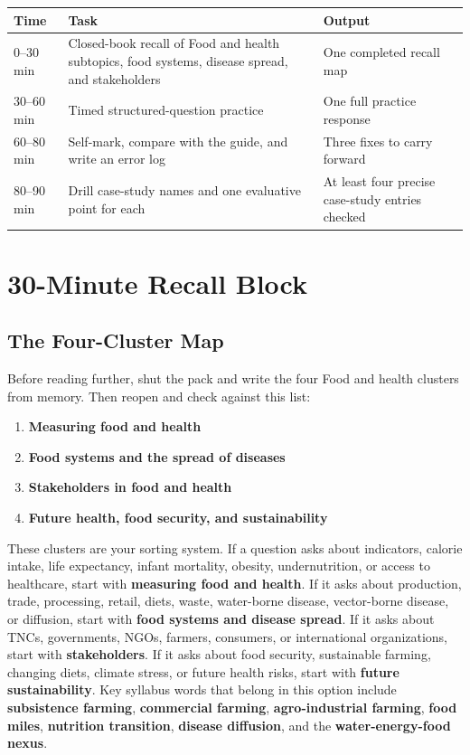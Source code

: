 \documentclass[11pt,a4paper]{article}
\newcommand{\term}[1]{\textcolor{HeadingBlue}{\textbf{#1}}}
\begin{document}
\begin{tabularx}{\textwidth}{L{0.16\textwidth}Y L{0.24\textwidth}}
\toprule
\textbf{Time} & \textbf{Task} & \textbf{Output} \\
--30 min & Closed-book recall of Food and health subtopics, food systems,
disease spread, and stakeholders & One completed recall map \\
30--60 min & Timed structured-question practice & One full practice response \\
60--80 min & Self-mark, compare with the guide, and write an error log & Three
fixes to carry forward \\
80--90 min & Drill case-study names and one evaluative point for each & At
least four precise case-study entries checked \\
\bottomrule
\end{tabularx}

\section{30-Minute Recall Block}

\subsection{The Four-Cluster Map}

Before reading further, shut the pack and write the four Food and health
clusters from memory. Then reopen and check against this list:

\begin{enumerate}
  \item \term{Measuring food and health}
  \item \term{Food systems and the spread of diseases}
  \item \term{Stakeholders in food and health}
  \item \term{Future health, food security, and sustainability}
\end{enumerate}

These clusters are your sorting system. If a question asks about indicators,
calorie intake, life expectancy, infant mortality, obesity, undernutrition, or
access to healthcare, start with \term{measuring food and health}. If it asks
about production, trade, processing, retail, diets, waste, water-borne disease,
vector-borne disease, or diffusion, start with \term{food systems and disease
spread}. If it asks about TNCs, governments, NGOs, farmers, consumers, or
international organizations, start with \term{stakeholders}. If it asks about
food security, sustainable farming, changing diets, climate stress, or future
health risks, start with \term{future sustainability}. Key syllabus words that
belong in this option include \term{subsistence farming},
\term{commercial farming}, \term{agro-industrial farming}, \term{food miles},
\term{nutrition transition}, \term{disease diffusion}, and the
\term{water-energy-food nexus}.
\end{document}
